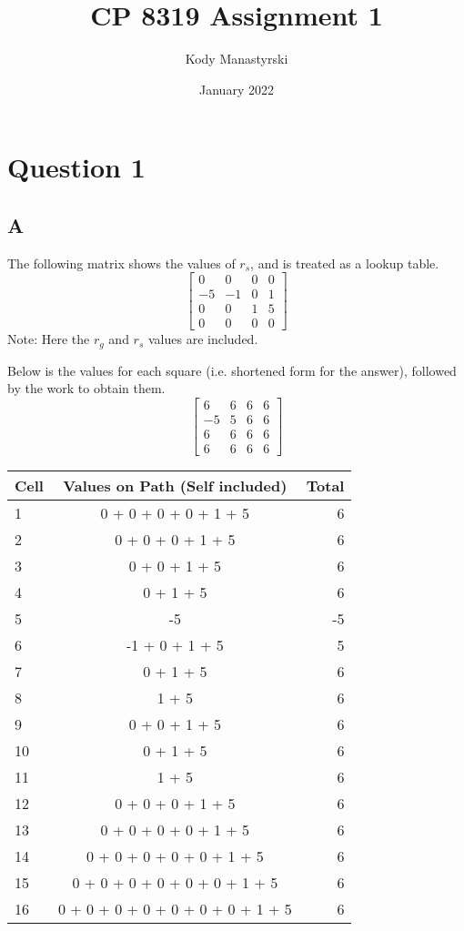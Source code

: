 \documentclass{article}
\author{Kody Manastyrski}
\date{January 2022}
\title{CP 8319 Assignment 1}
\begin{document}
\maketitle

\section{Question 1}
\subsection{A}
The following matrix shows the values of $r_s$, and is treated as a lookup table.
\[
\begin{bmatrix}
	0 & 0 & 0 & 0 \\
	-5 & -1 & 0 & 1 \\
	0 & 0 & 1 & 5 \\
	0 & 0 & 0 & 0
\end{bmatrix}
\]
Note: Here the $r_g$ and $r_s$ values are included.

Below is the values for each square (i.e. shortened form for the answer), 
followed by the work to obtain them.
\[
\begin{bmatrix}
	6 & 6 & 6 & 6 \\
	-5 & 5 & 6 & 6 \\
	6 & 6 & 6 & 6 \\
	6 & 6 & 6 & 6
\end{bmatrix}
\]

\begin{table}[H]
\begin{tabular}{|l|c|r|}
	\hline
	Cell & Values on Path (Self included) & Total\\
	\hline
	1 & 0 + 0 + 0 + 0 + 1 + 5 & 6\\
	2 & 0 + 0 + 0 + 1 + 5 & 6 \\
	3 & 0 + 0 + 1 + 5 & 6 \\
	4 & 0 + 1 + 5 & 6 \\
	5 & -5 & -5 \\
	6 & -1 + 0 + 1 + 5 & 5 \\
	7 & 0 + 1 + 5 & 6 \\
	8 & 1 + 5 & 6 \\
	9 & 0 + 0 + 1 + 5 & 6 \\
	10 & 0 + 1 + 5 & 6 \\
	11 & 1 + 5 & 6 \\
	12 & 0 + 0 + 0 + 1 + 5 & 6 \\
	13 & 0 + 0 + 0 + 0 + 1 + 5 & 6 \\
	14 & 0 + 0 + 0 + 0 + 0 + 1 + 5 & 6 \\
	15 & 0 + 0 + 0 + 0 + 0 + 0 + 1 + 5 & 6 \\
	16 & 0 + 0 + 0 + 0 + 0 + 0 + 0 + 1 + 5 & 6 \\
	\hline
\end{tabular}
\end{table}
\end{document}
